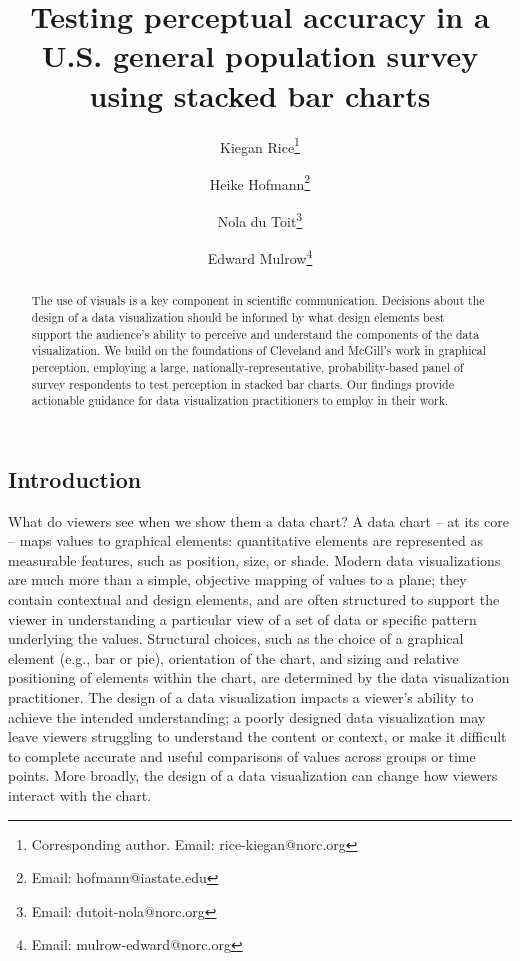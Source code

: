 \documentclass[
]{jds}
\author[1]{Kiegan Rice\thanks{Corresponding author. Email: rice-kiegan@norc.org}}
\author[2]{Heike Hofmann\footnote{Email: hofmann@iastate.edu}}
\author[1]{Nola du Toit\footnote{Email: dutoit-nola@norc.org}}
\author[1]{Edward Mulrow\footnote{Email: mulrow-edward@norc.org}}
\affil[1]{NORC at the University of Chicago}
\affil[2]{Department of Statistics, Iowa State University}
\title[Testing stacked bar charts in surveys]{Testing perceptual accuracy in a U.S. general population survey
using stacked bar charts}
\date{}
\begin{document}
\maketitle
\begin{abstract}
The use of visuals is a key component in scientific communication.
Decisions about the design of a data visualization should be informed by
what design elements best support the audience's ability to perceive and
understand the components of the data visualization. We build on the
foundations of Cleveland and McGill's work in graphical perception,
employing a large, nationally-representative, probability-based panel of
survey respondents to test perception in stacked bar charts. Our
findings provide actionable guidance for data visualization
practitioners to employ in their work.
\end{abstract}
\ifdefined\Shaded\renewenvironment{Shaded}{\begin{tcolorbox}[breakable, boxrule=0pt, sharp corners, interior hidden, enhanced, borderline west={3pt}{0pt}{shadecolor}, frame hidden]}{\end{tcolorbox}}\fi


  \newcommand{\blandscape}{\begin{landscape}} 
  \newcommand{\elandscape}{\end{landscape}}

  \setlength{\parindent}{0pt}
  \singlespacing

\hypertarget{introduction}{%
\subsection{Introduction}\label{introduction}}

What do viewers see when we show them a data chart? A data chart -- at
its core -- maps values to graphical elements: quantitative elements are
represented as measurable features, such as position, size, or shade.
Modern data visualizations are much more than a simple, objective
mapping of values to a plane; they contain contextual and design
elements, and are often structured to support the viewer in
understanding a particular view of a set of data or specific pattern
underlying the values. Structural choices, such as the choice of a
graphical element (e.g., bar or pie), orientation of the chart, and
sizing and relative positioning of elements within the chart, are
determined by the data visualization practitioner. The design of a data
visualization impacts a viewer's ability to achieve the intended
understanding; a poorly designed data visualization may leave viewers
struggling to understand the content or context, or make it difficult to
complete accurate and useful comparisons of values across groups or time
points. More broadly, the design of a data visualization can change how
viewers interact with the chart.
\end{document}
